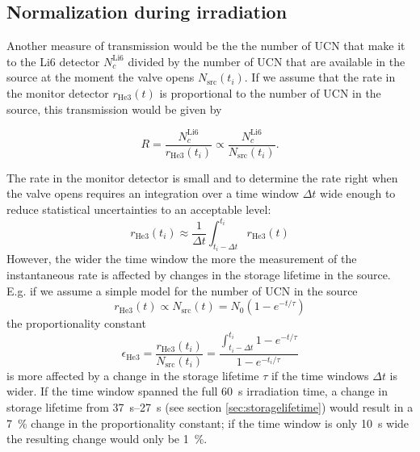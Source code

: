 \documentclass[10pt,letterpaper]{article}
\begin{document}
\subsection{Normalization during irradiation}

Another measure of transmission would be the the number of UCN that make it to the Li6 detector $N^\mathrm{Li6}_c$ divided by the number of UCN that are available in the source at the moment the valve opens $N_\mathrm{src}(t_i)$.
If we assume that the rate in the monitor detector $r_\mathrm{He3}(t)$ is proportional to the number of UCN in the source, this transmission would be given by

\begin{equation}
R = \frac{N_c^\mathrm{Li6}}{r_\mathrm{He3}(t_i)} \propto \frac{N_c^\mathrm{Li6}}{N_\mathrm{src}(t_i)} .
\end{equation}

The rate in the monitor detector is small and to determine the rate right when the valve opens requires an integration over a time window $\Delta t$ wide enough to reduce statistical uncertainties to an acceptable level:
\begin{equation}
r_\mathrm{He3}(t_i) \approx \frac{1}{\Delta t} \int_{t_i - \Delta t}^{t_i}  r_\mathrm{He3}(t)
\end{equation}
However, the wider the time window the more the measurement of the instantaneous rate is affected by changes in the storage lifetime in the source. E.g. if we assume a simple model for the number of UCN in the source
\begin{equation}
r_\mathrm{He3}(t) \propto N_\mathrm{src}(t) = N_0 \left( 1 - e^{-t/\tau} \right)
\end{equation}
the proportionality constant
\begin{equation}
\epsilon_\mathrm{He3} = \frac{r_\mathrm{He3}(t_i)}{N_\mathrm{src}(t_i)} = \frac{\int_{t_i - \Delta t}^{t_i} 1 - e^{-t/\tau}}{1 - e^{-t_i/\tau}}
\end{equation}
is more affected by a change in the storage lifetime $\tau$ if the time windows $\Delta t$ is wider. If the time window spanned the full \SI{60}{\second} irradiation time, a change in storage lifetime from \SIrange{37}{27}{\second} (see section \ref{sec:storagelifetime}) would result in a \SI{7}{\percent} change in the proportionality constant; if the time window is only \SI{10}{\second} wide the resulting change would only be \SI{1}{\percent}.
\end{document}
